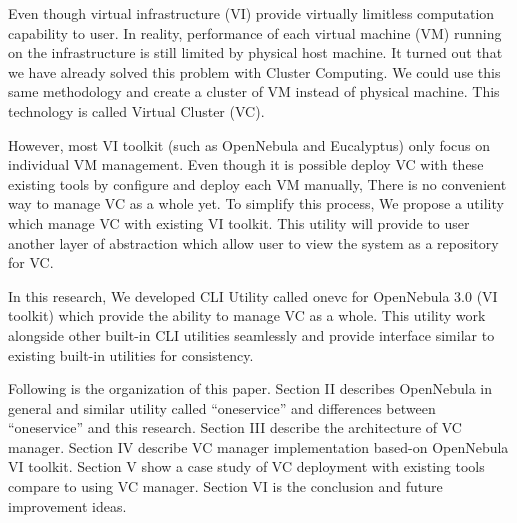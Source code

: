 \documentclass[conference]{IEEEtran}
\begin{document}
Even though virtual infrastructure (VI) provide virtually limitless computation capability to user.
In reality, performance of each virtual machine (VM) running on the infrastructure is still limited by physical host machine.
It turned out that we have already solved this problem with Cluster Computing.
We could use this same methodology and create a cluster of VM instead of physical machine.
This technology is called Virtual Cluster\cite{1630864} (VC).

However, most VI toolkit (such as OpenNebula\cite{10.1109/MIC.2009.119} and Eucalyptus\cite{nurmi2009eucalyptus}) only focus on individual VM management.
Even though it is possible deploy VC with these existing tools by configure and deploy each VM manually, There is no convenient way to manage VC as a whole yet.
To simplify this process, We propose a utility which manage VC with existing VI toolkit.
This utility will provide to user another layer of abstraction which allow user to view the system as a repository for VC.

In this research, We developed CLI Utility called onevc for OpenNebula 3.0 (VI toolkit) which provide the ability to manage VC as a whole.
This utility work alongside other built-in CLI utilities seamlessly and provide interface similar to existing built-in utilities for consistency.

Following is the organization of this paper.
Section II describes OpenNebula in general and similar utility called ``oneservice'' and differences between ``oneservice'' and this research.
Section III describe the architecture of VC manager.
Section IV describe VC manager implementation based-on OpenNebula VI toolkit.
Section V show a case study of VC deployment with existing tools compare to using VC manager.
Section VI is the conclusion and future improvement ideas.



%
%
\end{document}
